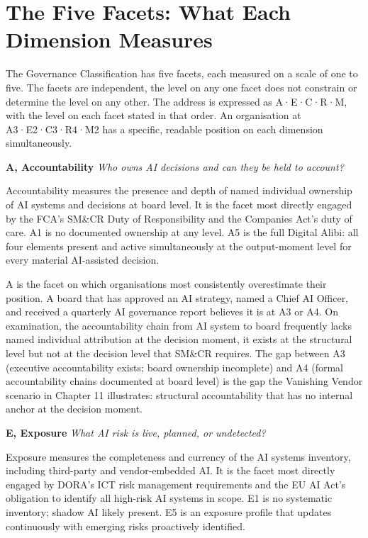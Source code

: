 \scenebreak

\section{The Five Facets: What Each Dimension Measures}

The Governance Classification has five facets, each measured on a scale of one to five. The facets are independent, the level on any one facet does not constrain or determine the level on any other. The address is expressed as A·E·C·R·M, with the level on each facet stated in that order. An organisation at A3·E2·C3·R4·M2 has a specific, readable position on each dimension simultaneously.

\textbf{A, Accountability} \emph{Who owns AI decisions and can they be held to account?}

Accountability measures the presence and depth of named individual ownership of AI systems and decisions at board level. It is the facet most directly engaged by the FCA's SM\&CR Duty of Responsibility and the Companies Act's duty of care. A1 is no documented ownership at any level. A5 is the full Digital Alibi: all four elements present and active simultaneously at the output-moment level for every material AI-assisted decision.

A is the facet on which organisations most consistently overestimate their position. A board that has approved an AI strategy, named a Chief AI Officer, and received a quarterly AI governance report believes it is at A3 or A4. On examination, the accountability chain from AI system to board frequently lacks named individual attribution at the decision moment, it exists at the structural level but not at the decision level that SM\&CR requires. The gap between A3 (executive accountability exists; board ownership incomplete) and A4 (formal accountability chains documented at board level) is the gap the Vanishing Vendor scenario in Chapter 11 illustrates: structural accountability that has no internal anchor at the decision moment.

\textbf{E, Exposure} \emph{What AI risk is live, planned, or undetected?}

Exposure measures the completeness and currency of the AI systems inventory, including third-party and vendor-embedded AI. It is the facet most directly engaged by DORA's ICT risk management requirements and the EU AI Act's obligation to identify all high-risk AI systems in scope. E1 is no systematic inventory; shadow AI likely present. E5 is an exposure profile that updates continuously with emerging risks proactively identified.

